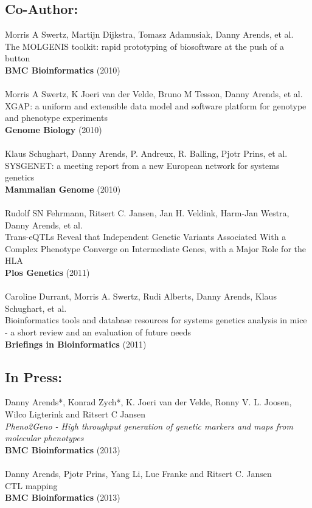 \documentclass[8pt, twoside, a5paper]{report}
\newcommand{\authors}[1]{\small{#1}}
\newcommand{\bold}[1]{{\bfseries #1}}
\begin{document}
\subsection*{Co-Author:}
  \authors{Morris A Swertz, Martijn Dijkstra, Tomasz Adamusiak, Danny Arends, et al.}\\
  The MOLGENIS toolkit: rapid prototyping of biosoftware at the push of a button\\
  \bold{BMC Bioinformatics} (2010)\\\\
  \authors{Morris A Swertz, K Joeri van der Velde, Bruno M Tesson, Danny Arends, et al.}\\
  XGAP: a uniform and extensible data model and software platform for genotype and phenotype experiments\\
  \bold{Genome Biology} (2010)\\\\
  \authors{Klaus Schughart, Danny Arends, P. Andreux, R. Balling, Pjotr Prins, et al.}\\
  SYSGENET: a meeting report from a new European network for systems genetics\\
  \bold{Mammalian Genome} (2010)\\\\
  \authors{Rudolf SN Fehrmann, Ritsert C. Jansen, Jan H. Veldink, Harm-Jan Westra, Danny Arends, et al.}\\
  Trans-eQTLs Reveal that Independent Genetic Variants Associated With a Complex Phenotype Converge on Intermediate Genes, with a Major Role for the HLA\\
  \bold{Plos Genetics} (2011)\\\\
  \authors{Caroline Durrant, Morris A. Swertz, Rudi Alberts, Danny Arends, Klaus Schughart, et al.}\\
  Bioinformatics tools and database resources for systems genetics analysis in mice - a short review and an evaluation of future needs\\
  \bold{Briefings in Bioinformatics} (2011)

\subsection*{In Press:}
  \authors{Danny Arends*, Konrad Zych*, K. Joeri van der Velde, Ronny V. L. Joosen, Wilco Ligterink and Ritsert C Jansen}\\
  \emph{Pheno2Geno - High throughput generation of genetic markers and maps from molecular phenotypes}\\
  \bold{BMC Bioinformatics} (2013)\\\\
  \authors{Danny Arends, Pjotr Prins, Yang Li, Lue Franke and Ritsert C. Jansen}\\
  CTL mapping\\
  \bold{BMC Bioinformatics} (2013)\\\\
\end{document}
